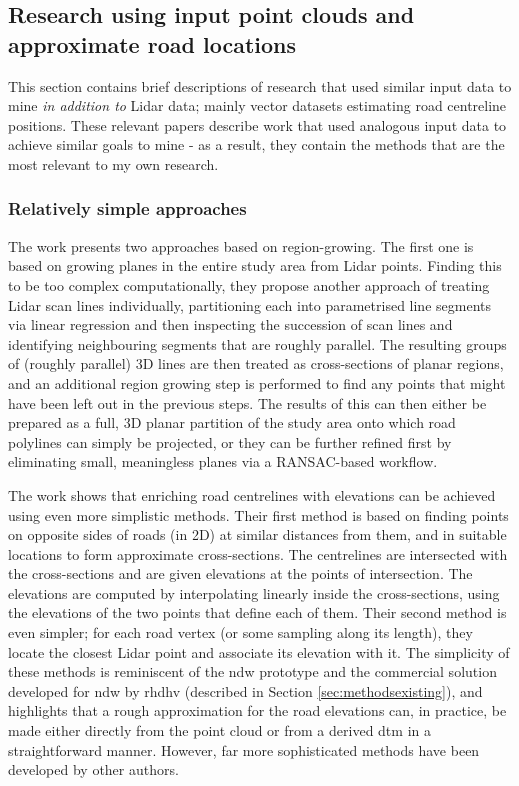 \subsection{Research using input point clouds and approximate road locations}
\label{sub:lidaraccuracy_external}

This section contains brief descriptions of research that used similar input data to mine \textit{in addition to} Lidar data; mainly vector datasets estimating road centreline positions. These relevant papers describe work that used analogous input data to achieve similar goals to mine - as a result, they contain the methods that are the most relevant to my own research.

\subsubsection{Relatively simple approaches}

The work \cite{hatger_brenner_2003} presents two approaches based on region-growing. The first one is based on growing planes in the entire study area from Lidar points. Finding this to be too complex computationally, they propose another approach of treating Lidar scan lines individually, partitioning each into parametrised line segments via linear regression and then inspecting the succession of scan lines and identifying neighbouring segments that are roughly parallel. The resulting groups of (roughly parallel) 3D lines are then treated as cross-sections of planar regions, and an additional region growing step is performed to find any points that might have been left out in the previous steps. The results of this can then either be prepared as a full, 3D planar partition of the study area onto which road polylines can simply be projected, or they can be further refined first by eliminating small, meaningless planes via a RANSAC-based workflow.

The work \cite{cai_rasdorf_2008} shows that enriching road centrelines with elevations can be achieved using even more simplistic methods. Their first method is based on finding points on opposite sides of roads (in 2D) at similar distances from them, and in suitable locations to form approximate cross-sections. The centrelines are intersected with the cross-sections and are given elevations at the points of intersection. The elevations are computed by interpolating linearly inside the cross-sections, using the elevations of the two points that define each of them. Their second method is even simpler; for each road vertex  (or some sampling along its length), they locate the closest Lidar point and associate its elevation with it. The simplicity of these methods is reminiscent of the \ac{ndw} prototype and the commercial solution developed for \ac{ndw} by \ac{rhdhv} (described in Section \ref{sec:methodsexisting}), and highlights that a rough approximation for the road elevations can, in practice, be made either directly from the point cloud or from a derived \ac{dtm} in a straightforward manner. However, far more sophisticated methods have been developed by other authors.

